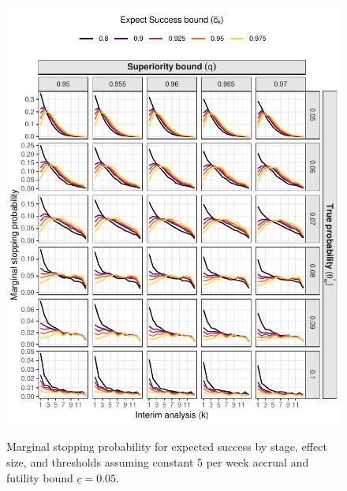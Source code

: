 \documentclass{article}
\begin{document}
\begin{figure}[!ht]
	\caption{Marginal stopping probability for expected success by stage, effect size, and thresholds assuming constant 5 per week accrual and futility bound $\underline{c}=0.05$.}
	\includegraphics{stop_expect_success_5.pdf}
	\label{fig:stop_expect_success_5}
\end{figure}
\end{document}
